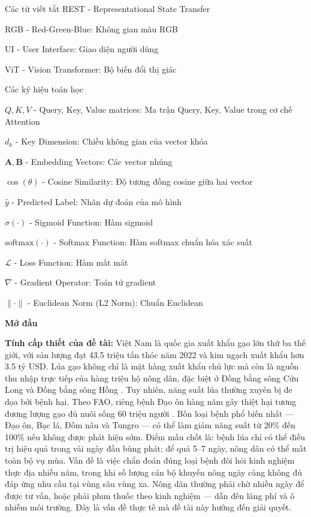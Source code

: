 \documentclass{uetgraduation}
\begin{document}
\begin{contentlisting}
\begin{contentlistingsection}{Các từ viết tắt}
REST - Representational State Transfer

RGB - Red-Green-Blue: Không gian màu RGB

UI - User Interface: Giao diện người dùng

ViT - Vision Transformer: Bộ biến đổi thị giác

\end{contentlistingsection}

\begin{contentlistingsection}{Các ký hiệu toán học}

$Q, K, V$ - Query, Key, Value matrices: Ma trận Query, Key, Value trong cơ chế Attention

$d_k$ - Key Dimension: Chiều không gian của vector khóa

$\mathbf{A}, \mathbf{B}$ - Embedding Vectors: Các vector nhúng

$\cos(\theta)$ - Cosine Similarity: Độ tương đồng cosine giữa hai vector

$\hat{y}$ - Predicted Label: Nhãn dự đoán của mô hình

$\sigma(\cdot)$ - Sigmoid Function: Hàm sigmoid

$\text{softmax}(\cdot)$ - Softmax Function: Hàm softmax chuẩn hóa xác suất

$\mathcal{L}$ - Loss Function: Hàm mất mát

$\nabla$ - Gradient Operator: Toán tử gradient

$\|\cdot\|$ - Euclidean Norm (L2 Norm): Chuẩn Euclidean

\end{contentlistingsection}
\end{contentlisting}
\begin{center}
    \textbf{\fontsize{16pt}{19pt}\selectfont Mở đầu}
\end{center}
\vspace{0.5cm}

\textbf{Tính cấp thiết của đề tài:} Việt Nam là quốc gia xuất khẩu gạo lớn thứ ba thế giới, với sản lượng đạt 43.5 triệu tấn thóc năm 2022 và kim ngạch xuất khẩu hơn 3.5 tỷ USD. Lúa gạo không chỉ là mặt hàng xuất khẩu chủ lực mà còn là nguồn thu nhập trực tiếp của hàng triệu hộ nông dân, đặc biệt ở Đồng bằng sông Cửu Long và Đồng bằng sông Hồng \cite{fao2023}. Tuy nhiên, năng suất lúa thường xuyên bị đe dọa bởi bệnh hại. Theo FAO, riêng bệnh Đạo ôn hàng năm gây thiệt hại tương đương lượng gạo đủ nuôi sống 60 triệu người \cite{valent1991}. Bốn loại bệnh phổ biến nhất --- Đạo ôn, Bạc lá, Đốm nâu và Tungro --- có thể làm giảm năng suất từ 20\% đến 100\% nếu không được phát hiện sớm. Điểm mấu chốt là: bệnh lúa chỉ có thể điều trị hiệu quả trong vài ngày đầu bùng phát; để quá 5--7 ngày, nông dân có thể mất toàn bộ vụ mùa. Vấn đề là việc chẩn đoán đúng loại bệnh đòi hỏi kinh nghiệm thực địa nhiều năm, trong khi số lượng cán bộ khuyến nông ngày càng không đủ đáp ứng nhu cầu tại vùng sâu vùng xa. Nông dân thường phải chờ nhiều ngày để được tư vấn, hoặc phải phun thuốc theo kinh nghiệm --- dẫn đến lãng phí và ô nhiễm môi trường. Đây là vấn đề thực tế mà đề tài này hướng đến giải quyết.
\end{document}
